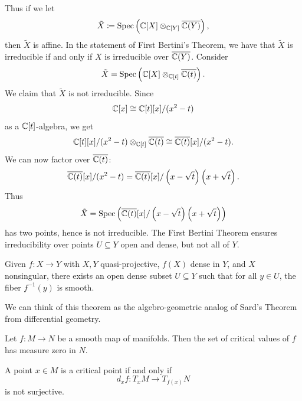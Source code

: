 Thus if we let
\[
    \tilde{X} \coloneqq \mathrm{Spec}\left(\mathbb{C}[X]\otimes_{\mathbb{C}[Y]}\overline{\mathbb{C}(Y)}\right),
\]
then $\tilde{X}$ is affine.
In the statement of First Bertini's Theorem, we have that $\tilde{X}$ is irreducible if and only if $X$ is irreducible over $\overline{\mathbb{C}(Y)}$.
Consider
\[
    \tilde{X} = \mathrm{Spec}\left(\mathbb{C}[X]\otimes_{\mathbb{C}[t]}\overline{\mathbb{C}(t)}\right).
\]
We claim that $\tilde{X}$ is not irreducible.
Since
\[
    \mathbb{C}[x]\cong \mathbb{C}[t][x]/(x^2-t)
\]
as a $\mathbb{C}[t]$-algebra, we get
\[
    \mathbb{C}[t][x]/(x^2-t)\otimes_{\mathbb{C}[t]}\overline{\mathbb{C}(t)}
    \cong
    \overline{\mathbb{C}(t)}[x]/(x^2-t).
\]
We can now factor over $\overline{\mathbb{C}(t)}$:
\[
    \overline{\mathbb{C}(t)}[x]/(x^2-t)
    =
    \overline{\mathbb{C}(t)}[x]/\left(x-\sqrt{t}\right)\left(x+\sqrt{t}\right).
\]
Thus
\[
    \tilde{X}
    =
    \mathrm{Spec}\left(\overline{\mathbb{C}(t)}[x]/\left(x-\sqrt{t}\right)\left(x+\sqrt{t}\right)\right)
\]
has two points, hence is not irreducible.
The First Bertini Theorem ensures irreducibility over points $U\subseteq Y$ open and dense, but not all of $Y$.

\begin{theorem*}{
    Given $f : X\to Y$ with $X,Y$ quasi-projective, $f(X)$ dense in $Y$, and $X$ nonsingular, there exists an open dense subset $U\subseteq Y$ such that for all $y\in U$, the fiber $f^{-1}(y)$ is smooth.
}
\end{theorem*}

We can think of this theorem as the algebro-geometric analog of Sard's Theorem from differential geometry.

\begin{theorem*}{
    Let $f : M\to N$ be a smooth map of manifolds.
    Then the set of critical values of $f$ has measure zero in $N$.
}
\end{theorem*}

\begin{definition}
    A point $x\in M$ is a critical point if and only if
    \[
        d_{x}f : T_{x}M\to T_{f(x)}N
    \]
    is not surjective.
\end{definition}